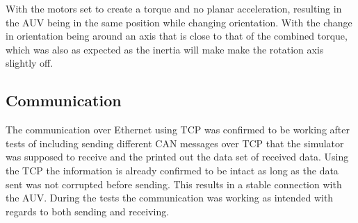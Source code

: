 With the motors set to create a torque and no planar acceleration, resulting in the AUV being in the same position while changing orientation. With the change in orientation being around an axis that is close to that of the combined torque, which was also as expected as the inertia will make make the rotation axis slightly off.

\subsection{Communication}
The communication over Ethernet using TCP was confirmed to be working after tests of including sending different CAN messages over TCP that the simulator was supposed to receive and the printed out the data set of received data. Using the TCP the information is already confirmed to be intact as long as the data sent was not corrupted before sending. This results in a stable connection with the AUV. During the tests the communication was working as intended with regards to both sending and receiving. 